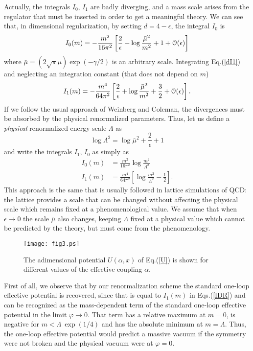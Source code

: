 \documentclass[aps,preprint]{revtex4}
\newcommand{\BE}{\begin{equation}}
\newcommand{\EE}{\end{equation}}
\newcommand{\nn}{\nonumber}
\begin{document}
Actually, the integrals $I_0$, $I_1$ are badly diverging, and a mass scale arises from the regulator that must be
inserted in order to get a meaningful theory.  We can see that, in dimensional regularization, by
setting $d=4-\epsilon$, the integral $I_0$ is
\BE
I_0(m)=-\frac{m^2}{16\pi^2}\left[\frac{2}{\epsilon} + \log \frac{\bar\mu^2}{m^2}+1+{\cal O}(\epsilon)\right]
\EE
where $\bar \mu=(2\sqrt{\pi}\mu)\exp(-\gamma/2)$ is an arbitrary scale. Integrating Eq.(\ref{dI1})
and neglecting an integration constant (that does not depend on $m$)
\BE
I_1(m)=-\frac{m^4}{64\pi^2}\left[\frac{2}{\epsilon} + \log \frac{\bar\mu^2}{m^2}+\frac{3}{2}+{\cal O}(\epsilon)\right].
\EE
If we follow the usual approach of Weinberg and Coleman\cite{WC}, the divergences must be absorbed by the physical
renormalized parameters. Thus, let us define a {\it physical} renormalized energy scale $\Lambda$ as
\BE
\log \Lambda^2= \log \bar \mu^2+\frac{2}{\epsilon}+1
\label{Lambda}
\EE
and write the integrals $I_1$, $I_0$ as simply as
\begin{align}
I_0(m)&=\frac{m^2}{16\pi^2}\log \frac{m^2}{\Lambda^2}\nn\\
I_1(m)&=\frac{m^4}{64\pi^2}\left[\log \frac{m^2}{\Lambda^2}-\frac{1}{2}\right].
\label{IDR}
\end{align}
This approach is the same that is usually followed in lattice simulations of QCD: the lattice provides a
scale that can be changed without affecting the physical scale which remains fixed at a phenomenological value.
We assume that when $\epsilon\to 0$ the scale $\bar \mu$ also changes, keeping $\Lambda$ fixed at a physical
value which cannot be predicted by the theory, but must come from the phenomenology.

\begin{figure}[b] 
\centering
\texttt{[image: fig3.ps]}
\caption{The adimensional potential $U(\alpha,x)$ of Eq.(\ref{U}) is shown for different values
of the effective coupling $\alpha$.}  
\label{fig3}
\end{figure}

First of all, we observe that by our renormalization scheme the standard one-loop effective potential is recovered,
since that is equal to $I_1(m)$ in Eqs.(\ref{IDR}) and can be recognized as the mass-dependent term of the 
standard one-loop effective potential in the limit $\varphi\to 0$. That term has a relative maximum at $m=0$, 
is negative for $m<\Lambda\>\exp(1/4)$ and has the absolute minimum at $m=\Lambda$. Thus, the one-loop effective
potential would predict a massive vacuum if the symmetry were not broken and the physical vacuum were at $\varphi=0$.
\end{document}
